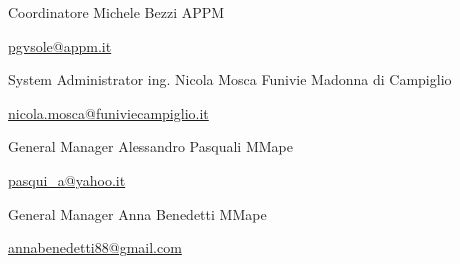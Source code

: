 

\begin{cventries}

  \cventry
    {Coordinatore} %
    {Michele Bezzi} %
    {APPM} %
    {} %
    {
      \begin{cvitems} %
        \item {\href{mailto:pgvsole@appm.it}{pgvsole@appm.it}}
      \end{cvitems}
    }

  \cventry
    {System Administrator} %
    {ing. Nicola Mosca} %
    {Funivie Madonna di Campiglio} %
    {} %
    {
      \begin{cvitems} %
        \item {\href{mailto:nicola.mosca@funiviecampiglio.it}{nicola.mosca@funiviecampiglio.it}}
      \end{cvitems}
    }

  \cventry
    {General Manager} %
    {Alessandro Pasquali} %
    {MMape} %
    {} %
    {
      \begin{cvitems} %
        \item {\href{mailto:pasqui\_a@yahoo.it}{pasqui\_a@yahoo.it}}
      \end{cvitems}
    }


  \cventry
    {General Manager} %
    {Anna Benedetti} %
    {MMape} %
    {} %
    {
      \begin{cvitems} %
        \item {\href{mailto:annabenedetti88@gmail.com}{annabenedetti88@gmail.com}}
      \end{cvitems}
    }
 
\end{cventries}
